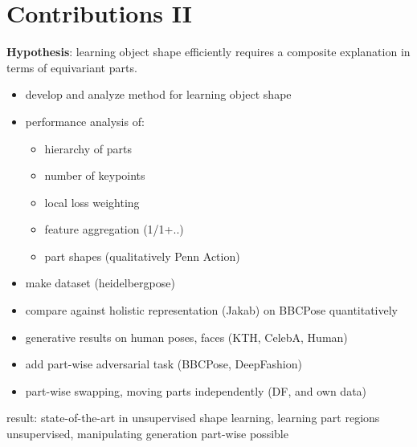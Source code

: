 \section{Contributions II}
	\textbf{Hypothesis}: learning object shape efficiently requires a composite explanation in terms of equivariant parts.
	\begin{itemize}
		\item develop and analyze method for learning object shape
		\item performance analysis of:
			\begin{itemize}
				\item hierarchy of parts
				\item number of keypoints
				\item local loss weighting
				\item feature aggregation (1/1+..)
				\item part shapes (qualitatively Penn Action)
			\end{itemize}
		\item make dataset (heidelbergpose)
		\item compare against holistic representation (Jakab) on BBCPose quantitatively
		\item generative results on human poses, faces (KTH, CelebA, Human)
		\item add part-wise adversarial task (BBCPose, DeepFashion)
		\item part-wise swapping, moving parts independently (DF, and own data)
	\end{itemize}
	result: state-of-the-art in unsupervised shape learning, learning part regions unsupervised, manipulating generation part-wise possible

